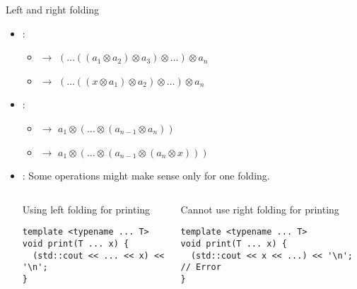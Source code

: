 \begin{frame}[t,fragile]{Left and right folding}
\begin{itemize}
  \item {}:
    \begin{itemize}
      \item {} \quad $\rightarrow$ \quad 
            $(\ldots((a_1 \otimes a_2) \otimes a_3) \otimes \ldots) \otimes a_n$
      \item {} \quad $\rightarrow$ \quad
            $(\ldots((x \otimes a_1) \otimes a_2) \otimes \ldots) \otimes a_n$
    \end{itemize}
  \item {}:
    \begin{itemize}
      \item {} \quad $\rightarrow$ \quad
            $a_1 \otimes (\ldots \otimes (a_{n-1} \otimes a_n))$ 
      \item {} \quad $\rightarrow$ \quad
            $a_1 \otimes (\ldots \otimes (a_{n-1} \otimes (a_n \otimes x)))$ 
    \end{itemize}

  \item {}: Some operations might make sense only for one folding.

\begin{columns}[T]

\begin{block}{Using left folding for printing}
\begin{lstlisting}
template <typename ... T>
void print(T ... x) {
  (std::cout << ... << x) << '\n';
}
\end{lstlisting}
\end{block}

\pause
{}
\begin{block}{Cannot use right folding for printing}
\begin{lstlisting}
template <typename ... T>
void print(T ... x) {
  (std::cout << x << ...) << '\n'; // Error
}
\end{lstlisting}
\end{block}

\end{columns}
\end{itemize}
\end{frame}


